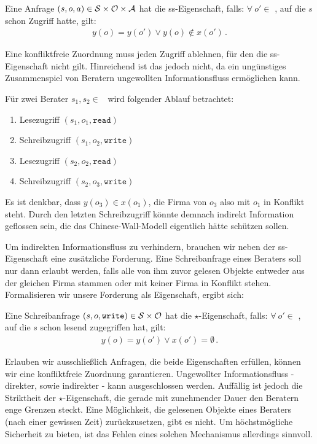 \begin{definition}\indexCWSimpleSecurity
	Eine Anfrage $(s, o, a) \in \mathcal{S} \times \mathcal{O} \times \mathcal{A}$ hat die ss-Eigenschaft, falls: \(\forall\ o' \in\) \calO, auf die \(s\) schon Zugriff hatte, gilt:
	\begin{align*}
		y(o) = y(o') \lor y(o) \notin x(o')\, .
	\end{align*}
\end{definition}

Eine konfliktfreie Zuordnung muss jeden Zugriff ablehnen, für den die ss-Eigenschaft nicht gilt. Hinreichend ist das jedoch nicht, da ein ungünstiges Zusammenspiel von Beratern ungewollten Informationsfluss ermöglichen kann.

\begin{beispiel}
	Für zwei Berater \(s_1, s_2 \in\) \calS\ wird folgender Ablauf betrachtet:
	\begin{multicols}{2}
		\begin{enumerate}
			\item Lesezugriff \((s_1, o_1, \texttt{read})\)
			\item Schreibzugriff \((s_1, o_2, \texttt{write})\)
			\item Lesezugriff \((s_2, o_2, \texttt{read})\)
			\item Schreibzugriff \((s_2, o_3, \texttt{write})\)
		\end{enumerate}
	\end{multicols}
	Es ist denkbar, dass \(y(o_3) \in x(o_1)\), die Firma von \(o_3\) also mit \(o_1\) in Konflikt steht. Durch den letzten Schreibzugriff könnte demnach indirekt Information geflossen sein, die das Chinese-Wall-Modell eigentlich hätte schützen sollen. 
\end{beispiel}

Um indirekten Informationsfluss zu verhindern, brauchen wir neben der ss-Eigenschaft eine zusätzliche Forderung. Eine Schreibanfrage eines Beraters soll nur dann erlaubt werden, falls alle von ihm zuvor gelesen Objekte entweder aus der gleichen Firma stammen oder mit keiner Firma in Konflikt stehen. Formalisieren wir unsere Forderung als Eigenschaft, ergibt sich:

\begin{definition}\indexCWStarProperty
	Eine Schreibanfrage $(s, o, \texttt{write}) \in \mathcal{S} \times \mathcal{O}$ hat die \(\star\)-Eigenschaft, falls: \(\forall\ o' \in\) \calO, auf die \(s\) schon lesend zugegriffen hat, gilt:
	\begin{align*}
		y(o) = y(o') \lor x(o') = \emptyset\, .
	\end{align*}
\end{definition}

Erlauben wir ausschließlich Anfragen, die beide Eigenschaften erfüllen, können wir eine konfliktfreie Zuordnung garantieren. Ungewollter Informationsfluss - direkter, sowie indirekter - kann ausgeschlossen werden. Auffällig ist jedoch die Striktheit der \(\star\)-Eigenschaft, die gerade mit zunehmender Dauer den Beratern enge Grenzen steckt. Eine Möglichkeit, die gelesenen Objekte eines Beraters (nach einer gewissen Zeit) zurückzusetzen, gibt es nicht. Um höchstmögliche Sicherheit zu bieten, ist das Fehlen eines solchen Mechanismus allerdings sinnvoll.
